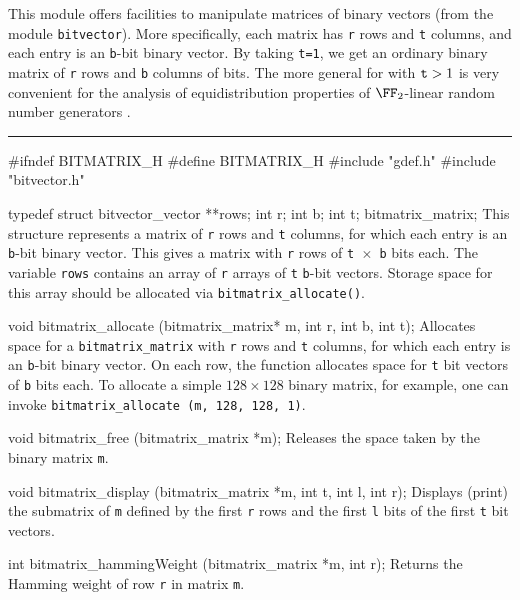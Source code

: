 
This module offers facilities to manipulate matrices of binary vectors
(from the module \texttt{bitvector}).
More specifically, each matrix has {\tt r} rows and {\tt t} columns,
and each entry is an {\tt b}-bit binary vector.
By taking {\tt t=1}, we get an ordinary binary matrix of {\tt r} rows and
{\tt b} columns of bits.
The more general for with ${\tt t} > 1$ is very convenient for the analysis of
equidistribution properties of $\FF_2$-linear random number generators
\cite{rLEC05a,rLEC09a,rPAN04t}.

\bigskip\hrule

\code\hide
#ifndef BITMATRIX_H
#define BITMATRIX_H
\endhide
#include "gdef.h"
#include "bitvector.h"
\endcode

\code

typedef struct{
  bitvector_vector **rows;
  int r;
  int b;
  int t;
} bitmatrix_matrix;
\endcode
 \tab
This structure represents a matrix of {\tt r} rows and {\tt t} columns,
for which each entry is an {\tt b}-bit binary vector.
This gives a matrix with {\tt r} rows of {\tt t $\times$ b} bits each.
The variable {\tt rows} contains an array of {\tt r} arrays of {\tt t} {\tt b}-bit vectors.
Storage space for this array should be allocated via {\tt bitmatrix\_allocate()}.
\endtab
\code

void bitmatrix_allocate (bitmatrix_matrix* m, int r, int b, int t);
\endcode
\tab
Allocates space for a {\tt bitmatrix\_matrix} with {\tt r} rows and {\tt t} columns,
for which each entry is an {\tt b}-bit binary vector.
On each row, the function allocates space for {\tt t} bit vectors of {\tt b} bits each.
To allocate a simple $128 \times 128$ binary matrix, for example, one can invoke
{\tt bitmatrix\_allocate (m, 128, 128, 1)}.
\endtab
\code

void bitmatrix_free (bitmatrix_matrix *m);
\endcode
 \tab
 Releases the space taken by the binary matrix {\tt m}.
 \endtab
\code

void bitmatrix_display (bitmatrix_matrix *m, int t, int l, int r);
\endcode
 \tab
Displays (print) the submatrix of {\tt *m} defined by the first {\tt r} rows and the
first {\tt l} bits of the first {\tt t} bit vectors.
 \endtab
 \code

int bitmatrix_hammingWeight (bitmatrix_matrix *m, int r);
\endcode
 \tab
 Returns the Hamming weight of row {\tt r} in matrix {\tt *m}.
 \endtab
 \code

